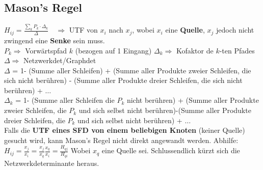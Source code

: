 	  \newpage 
\subsection{Mason's Regel }
  $\boxed{H_{ij} = \frac{\sum\limits_k P_k\cdot\Delta_k}{\Delta}}\quad
  \Rightarrow$ UTF von $x_i$ nach $x_j$, wobei \textbf{$x_i$} eine
  \textbf{Quelle}, \textbf{$x_j$} jedoch nicht zwingend eine \textbf{Senke} sein
  muss. \vspace{0.3cm}\\
  $P_k \Rightarrow$ Vorwärtspfad $k$ (bezogen auf 1 Eingang) \qquad $\Delta_k \Rightarrow$ Kofaktor de
  $k$-ten Pfades \qquad $\Delta \Rightarrow$ Netzwerkdet/Graphdet\vspace{0.3cm}\\
  $\Delta$ = 1- (Summe aller Schleifen) + (Summe aller Produkte zweier
  Schleifen, die sich nicht berühren) - (Summe
  aller Produkte dreier Schleifen, die sich nicht berühren) + $\ldots$
  \vspace{0.3cm}\\
  $\Delta_k$ = 1- (Summe aller Schleifen die $P_k$ nicht berühren) + (Summe
  aller Produkte zweier Schleifen, die $P_k$ und sich selbst nicht
  berühren)-(Summe aller Produkte dreier Schleifen, die $P_k$ und sich selbst
  nicht berühren) + $\ldots$ \\

  Falls die \textbf{UTF eines SFD von einem beliebigen Knoten} (keiner Quelle)
  gesucht wird, kann Mason's Regel nicht direkt angewandt werden. Abhilfe: \\
  $\boxed{H_{ij} = \frac{x_j}{x_i} = \frac{x_j}{x_q} \frac{x_q}{x_i} =
  \frac{H_{qj}}{H_{qi}}}$ Wobei $x_q$ eine Quelle sei. 
  Schlussendlich kürzt sich die Netzwerkdeterminante heraus.



